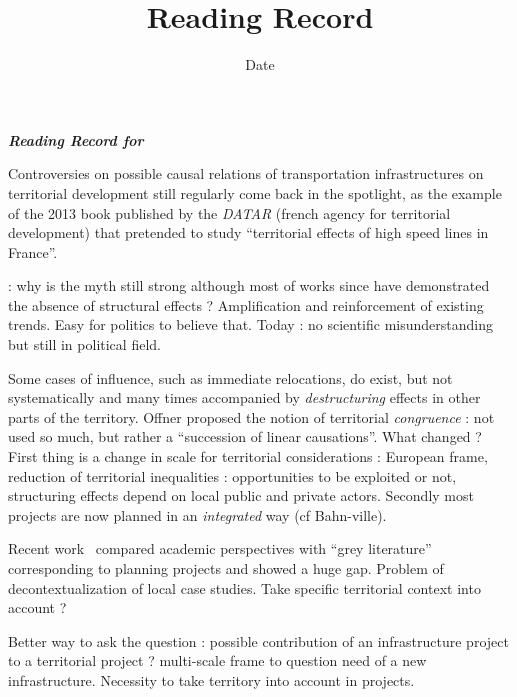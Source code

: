 


\title{Reading Record\bigskip\\
\cite{espacegeo2014effets}
}
\author{}
\date{Date}


\maketitle

\textbf{\textit{Reading Record for \cite{espacegeo2014effets}}}


Controversies on possible causal relations of transportation infrastructures on territorial development still regularly come back in the spotlight, as the example of the 2013 book published by the \emph{DATAR} (french agency for territorial development) that pretended to study ``territorial effects of high speed lines in France''.

 : why is the myth still strong although most of works since have demonstrated the absence of structural effects ? Amplification and reinforcement of existing trends. Easy for politics to believe that. Today : no scientific misunderstanding but still in political field.


 Some cases of influence, such as immediate relocations, do exist, but not systematically and many times accompanied by \emph{destructuring} effects in other parts of the territory. Offner proposed the notion of territorial \emph{congruence} : not used so much, but rather a ``succession of linear causations''. What changed ? First thing is a change in scale for territorial considerations : European frame, reduction of territorial inequalities : opportunities to be exploited or not, structuring effects depend on local public and private actors. Secondly most projects are now planned in an \emph{integrated} way (cf Bahn-ville).

 Recent work~\cite{bazin2011grande} compared academic perspectives with ``grey literature'' corresponding to planning projects and showed a huge gap. Problem of decontextualization of local case studies. Take specific territorial context into account ?


 Better way to ask the question : possible contribution of an infrastructure project to a territorial project ? multi-scale frame to question need of a new infrastructure. Necessity to take territory into account in projects.

